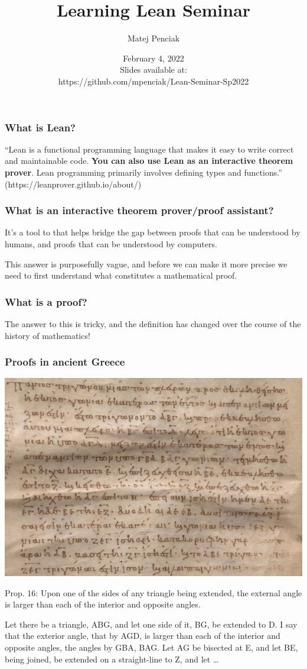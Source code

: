 \documentclass{beamer}
\title{Learning Lean Seminar}
\author{Matej Penciak}
\institute{Northeastern University}
\date{February 4, 2022 \\ Slides available at: \\ https://github.com/mpenciak/Lean-Seminar-Sp2022}
\begin{document}
\frame{\titlepage}

\begin{frame}
    \frametitle{What is Lean?}
    \pause
    ``Lean is a functional programming language that makes it easy to write correct and maintainable code. {\bf You can also use Lean as an interactive theorem prover}. Lean programming primarily involves defining types and functions.''
    (https://leanprover.github.io/about/)
\end{frame}

\begin{frame}
    \frametitle{What is an interactive theorem prover/proof assistant?}
    \pause
    It's a tool to that helps bridge the gap between proofs that can be understood by humans, and proofs that can be understood by computers.

    \vspace{20pt}
    \pause
    This answer is purposefully vague, and before we can make it more precise we need to first understand what constitutes a mathematical proof.
\end{frame}

\begin{frame}
    \frametitle{What is a proof?}
    \pause
    The answer to this is tricky, and the definition has changed over the course of the history of mathematics!
\end{frame}

\begin{frame}
    \frametitle{Proofs in ancient Greece}
    \begin{center}
        \includegraphics[scale=.3]{img/elements.png}
    \end{center}

    \pause
    Prop. 16: Upon one of the sides of any triangle being extended, the external angle is larger than each of the interior and opposite angles.
    
    Let there be a triangle, ABG, and let one side of it, BG, be extended to D. I say that the exterior angle, that by AGD, is larger than each of the interior and opposite angles, the angles by GBA, BAG. Let AG be bisected at E, and let BE, being joined, be extended on a straight-line to Z, and let \ldots
\end{frame}
\end{document}
